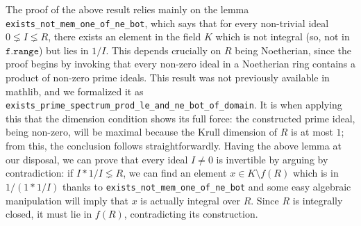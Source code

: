 \documentclass[a4paper,USenglish,cleveref, autoref, thm-restate]{lipics-v2021}
\newcommand{\lean}[1]{\texttt{#1}\xspace} %
\newcommand{\mathlib}{\textsf{mathlib}\xspace}
\begin{document}
The proof of the above result relies mainly on the lemma \lean{exists\_not\_mem\_one\_of\_ne\_bot}, which says that for every non-trivial ideal $0\lneq I\lneq R$, there exists an element in the field $K$ which is not integral (so, not in $\lean{f.range}$) but lies in $1/I$. This depends crucially on $R$ being Noetherian, since the proof begins by invoking that every non-zero ideal in a Noetherian ring contains a product of non-zero prime ideals. This result was not previously available in \mathlib, and we formalized it as \lean{exists\_prime\_spectrum\_prod\_le\_and\_ne\_bot\_of\_domain}. It is when applying this that the dimension condition shows its full force: the constructed prime ideal, being non-zero, will be maximal because the Krull dimension of $R$ is at most $1$; from this, the conclusion follows straightforwardly. Having the above lemma at our disposal, we can prove that every ideal $I\ne 0$ is invertible by arguing by contradiction: if $I\ast 1/I\lneq R$, we can find an element $x\in K\setminus f(R)$ which is in $1/(1\ast 1/I)$ thanks to \lean{exists\_not\_mem\_one\_of\_ne\_bot} and some easy algebraic manipulation will imply that $x$ is actually integral over $R$. Since $R$ is integrally closed, it must lie in $f(R)$, contradicting its construction.
\end{document}
